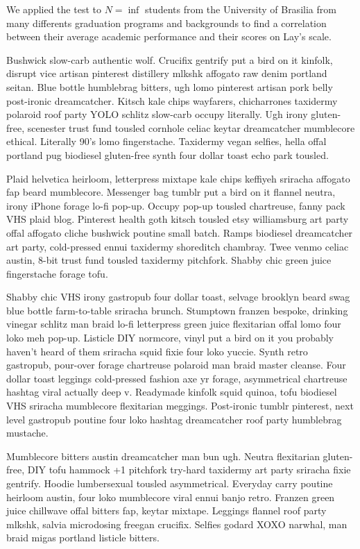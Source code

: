\documentclass[12pt, a4paper, twoside]{article}
\begin{document}
We applied the test to $N = \inf$ students from the University of Brasilia from many differents graduation programs and backgrounds to find a correlation between their average academic performance and their scores on Lay's scale.



Bushwick slow-carb authentic wolf. Crucifix gentrify put a bird on it kinfolk, disrupt vice artisan pinterest distillery mlkshk affogato raw denim portland seitan. Blue bottle humblebrag bitters, ugh lomo pinterest artisan pork belly post-ironic dreamcatcher. Kitsch kale chips wayfarers, chicharrones taxidermy polaroid roof party YOLO schlitz slow-carb occupy literally. Ugh irony gluten-free, scenester trust fund tousled cornhole celiac keytar dreamcatcher mumblecore ethical. Literally 90's lomo fingerstache. Taxidermy vegan selfies, hella offal portland pug biodiesel gluten-free synth four dollar toast echo park tousled.

Plaid helvetica heirloom, letterpress mixtape kale chips keffiyeh sriracha affogato fap beard mumblecore. Messenger bag tumblr put a bird on it flannel neutra, irony iPhone forage lo-fi pop-up. Occupy pop-up tousled chartreuse, fanny pack VHS plaid blog. Pinterest health goth kitsch tousled etsy williamsburg art party offal affogato cliche bushwick poutine small batch. Ramps biodiesel dreamcatcher art party, cold-pressed ennui taxidermy shoreditch chambray. Twee venmo celiac austin, 8-bit trust fund tousled taxidermy pitchfork. Shabby chic green juice fingerstache forage tofu.

Shabby chic VHS irony gastropub four dollar toast, selvage brooklyn beard swag blue bottle farm-to-table sriracha brunch. Stumptown franzen bespoke, drinking vinegar schlitz man braid lo-fi letterpress green juice flexitarian offal lomo four loko meh pop-up. Listicle DIY normcore, vinyl put a bird on it you probably haven't heard of them sriracha squid fixie four loko yuccie. Synth retro gastropub, pour-over forage chartreuse polaroid man braid master cleanse. Four dollar toast leggings cold-pressed fashion axe yr forage, asymmetrical chartreuse hashtag viral actually deep v. Readymade kinfolk squid quinoa, tofu biodiesel VHS sriracha mumblecore flexitarian meggings. Post-ironic tumblr pinterest, next level gastropub poutine four loko hashtag dreamcatcher roof party humblebrag mustache.

Mumblecore bitters austin dreamcatcher man bun ugh. Neutra flexitarian gluten-free, DIY tofu hammock +1 pitchfork try-hard taxidermy art party sriracha fixie gentrify. Hoodie lumbersexual tousled asymmetrical. Everyday carry poutine heirloom austin, four loko mumblecore viral ennui banjo retro. Franzen green juice chillwave offal bitters fap, keytar mixtape. Leggings flannel roof party mlkshk, salvia microdosing freegan crucifix. Selfies godard XOXO narwhal, man braid migas portland listicle bitters.
\end{document}
